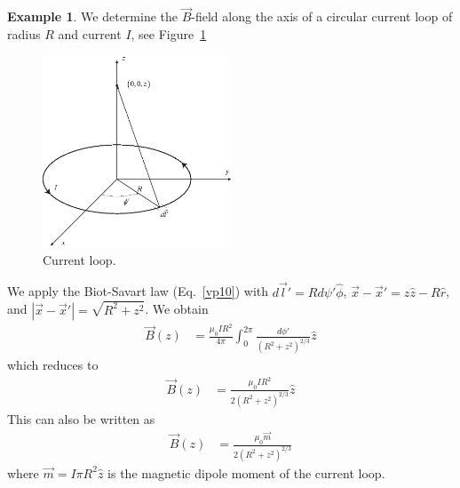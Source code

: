 \documentclass[11pt,a4paper,oneside]{book}
\numberwithin{equation}{section}
\newcommand{\abs}[1]{\left|#1\right|}
\theoremstyle{it}
\theoremstyle{definition}
\newtheorem{example}{Example}[section]
\begin{document}
\begin{example}
	We determine the $\vec{B}$-field along the axis of a circular current loop of radius $R$ and current $I$, see Figure~\ref{ex_326} 
\begin{figure}[H] 
\centering
\includegraphics[width = 0.5\textwidth, width = 250pt, angle = 0, keepaspectratio]{figures/current_loop.eps}
\captionsetup{width=0.75\textwidth}		
\caption{Current loop.}
\label{ex_326}
\end{figure}
We apply the Biot-Savart law (Eq.~\eqref{vp10}) with $d\vec{l}'= Rd\psi'\hat{\phi}$, $\vec{x}-\vec{x}'=z\hat{z}-R\hat{r}$, and $\abs{\vec{x}-\vec{x}'}=\sqrt{R^2+z^2}$. We obtain
 \begin{equation}\label{ex_326_1}
	\begin{aligned}
		\vec{B}(z)&=\frac{\mu_0 I R^2}{4\pi}\int_{0}^{2\pi}\frac{d\phi'}{(R^2+z^2)^{2/3}}\hat{z}
	\end{aligned}
\end{equation}
which reduces to 
 \begin{equation}\label{ex_326_2}
	\begin{aligned}
		\vec{B}(z)&=\frac{\mu_0 I R^2}{2(R^2+z^2)^{2/3}}\hat{z}
	\end{aligned}
\end{equation}
This can also be written as
 \begin{equation}\label{ex_326_3}
	\begin{aligned}
		\vec{B}(z)&=\frac{\mu_0 \vec{m}}{2(R^2+z^2)^{2/3}}
	\end{aligned}
\end{equation}
where $\vec{m}=I\pi R^2\hat{z}$ is the magnetic dipole moment of the current loop.
\end{example}
\end{document}

